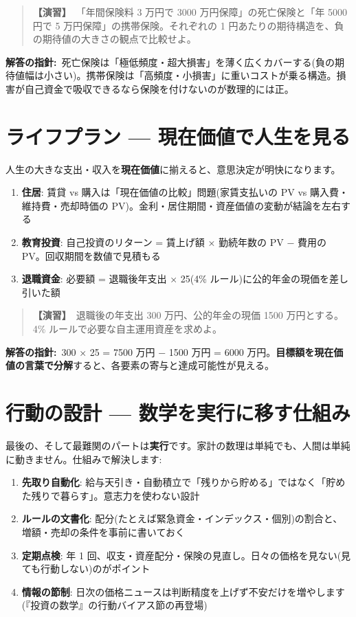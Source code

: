 \documentclass{article}
\begin{document}
\begin{quote}
\textbf{【演習】}\ 「年間保険料 3 万円で 3000 万円保障」の死亡保険と「年 5000 円で 5 万円保障」の携帯保険。それぞれの 1 円あたりの期待構造を、負の期待値の大きさの観点で比較せよ。
\end{quote}

\textbf{解答の指針:}\ 死亡保険は「極低頻度・超大損害」を薄く広くカバーする(負の期待値幅は小さい)。携帯保険は「高頻度・小損害」に重いコストが乗る構造。損害が自己資金で吸収できるなら保険を付けないのが数理的には正。

\section{ライフプラン — 現在価値で人生を見る}

人生の大きな支出・収入を\textbf{現在価値}に揃えると、意思決定が明快になります。

\begin{enumerate}
\item \textbf{住居}: 賃貸 vs 購入は「現在価値の比較」問題(家賃支払いの PV vs 購入費・維持費・売却時価の PV)。金利・居住期間・資産価値の変動が結論を左右する
\item \textbf{教育投資}: 自己投資のリターン = 賃上げ額 × 勤続年数の PV − 費用の PV。回収期間を数値で見積もる
\item \textbf{退職資金}: 必要額 = 退職後年支出 × 25(4\% ルール)に公的年金の現価を差し引いた額
\end{enumerate}

\begin{quote}
\textbf{【演習】}\ 退職後の年支出 300 万円、公的年金の現価 1500 万円とする。4\% ルールで必要な自主運用資産を求めよ。
\end{quote}

\textbf{解答の指針:}\ 300 × 25 = 7500 万円 − 1500 万円 = 6000 万円。\textbf{目標額を現在価値の言葉で分解}すると、各要素の寄与と達成可能性が見える。

\section{行動の設計 — 数学を実行に移す仕組み}

最後の、そして最難関のパートは\textbf{実行}です。家計の数理は単純でも、人間は単純に動きません。仕組みで解決します:

\begin{enumerate}
\item \textbf{先取り自動化}: 給与天引き・自動積立で「残りから貯める」ではなく「貯めた残りで暮らす」。意志力を使わない設計
\item \textbf{ルールの文書化}: 配分(たとえば緊急資金・インデックス・個別)の割合と、増額・売却の条件を事前に書いておく
\item \textbf{定期点検}: 年 1 回、収支・資産配分・保険の見直し。日々の価格を見ない(見ても行動しない)のがポイント
\item \textbf{情報の節制}: 日次の価格ニュースは判断精度を上げず不安だけを増やします(『投資の数学』の行動バイアス節の再登場)
\end{enumerate}
\end{document}
